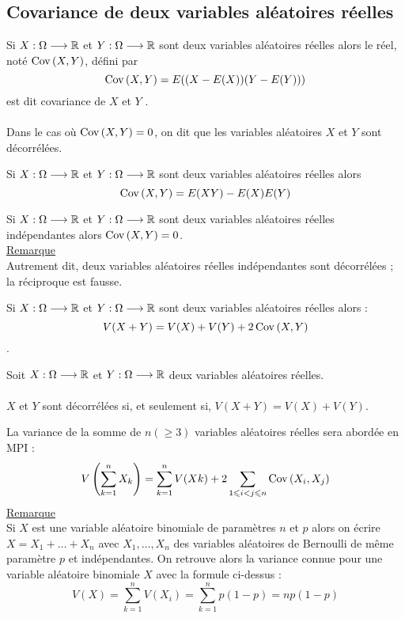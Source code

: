 \subsection{Covariance de deux variables aléatoires réelles}
\begin{defi}
    Si \(X : \Omega \longrightarrow \mathbb{R}\) et \(Y : \Omega \longrightarrow \mathbb{R}\) sont deux variables aléatoires réelles alors le réel, noté \(\operatorname{Cov}\left(X,Y\right)\), défini par
    \[\operatorname{Cov}\left(X,Y\right) = E ((X - E(X)) (Y - E(Y )))\]
    est dit covariance de \(X\) et \(Y\) .\\~\\
    Dans le cas où \(\operatorname{Cov}\left(X,Y\right) = 0\), on dit que les variables aléatoires \(X\) et \(Y\) sont décorrélées.
\end{defi}
\begin{prop}
    Si \(X : \Omega \longrightarrow \mathbb{R}\) et  \(Y : \Omega \longrightarrow \mathbb{R}\) sont deux variables aléatoires réelles alors
    \[\operatorname{Cov}\left(X,Y\right) = E(XY ) - E(X)E(Y )\]
\end{prop}
\begin{defprop}
    Si \(X : \Omega \longrightarrow \mathbb{R}\) et  \(Y : \Omega \longrightarrow \mathbb{R}\) sont deux variables aléatoires réelles indépendantes alors \(\operatorname{Cov}\left(X,Y\right) = 0\).\\
    \underline{Remarque}\\
    Autrement dit, deux variables aléatoires réelles indépendantes sont décorrélées ; la réciproque est fausse.
\end{defprop}
\begin{defprop}
    Si \(X : \Omega \longrightarrow \mathbb{R}\) et  \(Y : \Omega \longrightarrow \mathbb{R}\) sont deux variables aléatoires réelles alors :
    \[V(X + Y ) = V(X) + V(Y ) + 2\operatorname{Cov}\left(X,Y\right)\].
\end{defprop}
\begin{defprop}
  
    Soit \(X : \Omega \longrightarrow \mathbb{R}\) et  \(Y : \Omega \longrightarrow \mathbb{R}\) deux variables aléatoires réelles.\\~\\
    \(X\) et \(Y\) sont décorrélées si, et seulement si, \(V(X + Y ) = V(X) + V(Y )\).  
\end{defprop}

\begin{defprop}  
    La variance de la somme de \(n(\geq 3)\) variables aléatoires réelles sera abordée en MPI :
    \[V\left(\sum^n_{k=1}X_k\right)=\sum^n_{k=1}V(Xk) + 2 \sum_{1\leqslant i< j\leqslant n} \operatorname{Cov}\left(X_i,X_j\right)\]
    \underline{Remarque}\\
    Si \(X\) est une variable aléatoire binomiale de paramètres \(n\) et \(p\) alors on écrire \(X = X_1 + \dots + X_n\) avec \(X_1, \dots , X_n\) des variables aléatoires de Bernoulli de même paramètre \(p\) et indépendantes. On retrouve alors la variance connue pour une variable aléatoire binomiale \(X\) avec la formule ci-dessus :
    \[V(X) =\sum^n_{k=1} V(X_i) =\sum^n_{k=1}p(1 - p) = np(1 - p)\]
\end{defprop}
